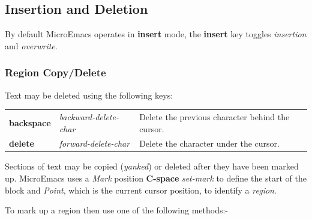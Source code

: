 \documentclass[11pt,a4paper,pdftex]{article}
\begin{document}
\subsection{Insertion and Deletion}

  By default MicroEmacs operates in \textbf{insert} mode, the \textbf{insert}
  key toggles \textit{insertion} and \textit{overwrite}.

\subsubsection{Region Copy/Delete}

  Text may be deleted using the following keys:

  \begin{longtable}{ll@{\ --\ }l}
    \endhead
    \endfoot
    \endlastfoot
    \textbf{backspace} & \textit{backward-delete-char} &
    Delete the previous character behind the cursor.\\
    \textbf{delete} & \textit{forward-delete-char} &
    Delete the character under the cursor.\\
  \end{longtable}

  Sections of text may be copied (\textit{yanked}) or deleted after they have
  been marked up. MicroEmacs uses a \textit{Mark} position \textbf{C-space}
  \textit{set-mark} to define the start of the block and \textit{Point}, which
  is the current cursor position, to identify a \textit{region}.

  To mark up a region then use one of the following methods:-
\end{document}
